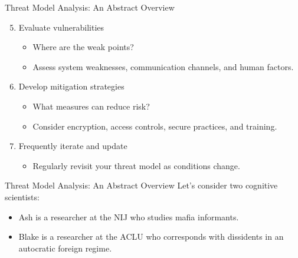 \documentclass[aspectratio=169]{beamer}
\renewcommand{\emph}[1]{{\color{magenta}#1}}
\begin{document}
\begin{frame}{Threat Model Analysis: An Abstract Overview}
  \begin{enumerate}
  \setcounter{enumi}{4}
    \item Evaluate \emph{vulnerabilities}
      \begin{itemize}
        \item Where are the weak points?
        \item[] Assess system weaknesses, communication channels, and human factors.
      \end{itemize}
    \item Develop \emph{mitigation strategies}
      \begin{itemize}
        \item What measures can reduce risk?
        \item[] Consider encryption, access controls, secure practices, and training.
      \end{itemize}
    \item Frequently \emph{iterate} and \emph{update}
      \begin{itemize}
        \item Regularly revisit your threat model as conditions change.
      \end{itemize}
  \end{enumerate}
\end{frame}


\begin{frame}{Threat Model Analysis: An Abstract Overview}
    Let's consider two cognitive scientists:\pause
    \begin{itemize}
      \item Ash is a researcher at the NIJ who studies mafia informants.
      \item Blake is a researcher at the ACLU who corresponds with dissidents in an autocratic foreign regime.
    \end{itemize}
\end{frame}
\end{document}
